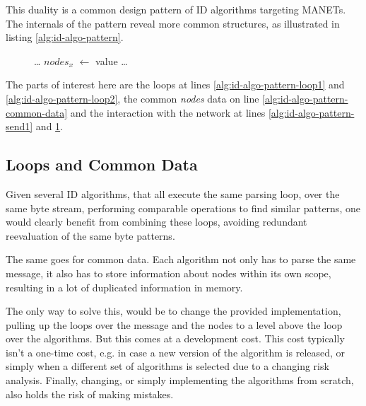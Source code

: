 \documentclass[conference]{IEEEtran}
\newcommand*\Let[2]{\State #1 $\gets$ #2}
\let\ForEach\ForAll
\begin{document}
This duality is a common design pattern of ID algorithms targeting MANETs. The
internals of the pattern reveal more common structures, as illustrated in
listing \ref{alg:id-algo-pattern}.

\begin{figure}[H]
\begin{algorithmic}[1]
    \ForEach{$byte \in msg$} \label{alg:id-algo-pattern-loop1}
     \State \dots {}
    \EndFor
    \Let{$nodes_x$}{value}  
    \State {}  \label{alg:id-algo-pattern-send1}
  \EndFunction
  \State
    \ForEach{$node \in nodes$} \label{alg:id-algo-pattern-loop2} \label{alg:id-algo-pattern-common-data}
       
        \State \dots {}
        \State {}  \label{alg:id-algo-pattern-send2}
      \EndIf
    \EndFor
  \EndFunction
  \State
\end{algorithmic}
\end{figure}

The parts of interest here are the loops at lines
\ref{alg:id-algo-pattern-loop1} and \ref{alg:id-algo-pattern-loop2}, the common
\emph{nodes} data on line \ref{alg:id-algo-pattern-common-data} and the
interaction with the network at lines \ref{alg:id-algo-pattern-send1} and
\ref{alg:id-algo-pattern-send2}.

\subsection{Loops and Common Data}

Given several ID algorithms, that all execute the same parsing loop, over the
same byte stream, performing comparable operations to find similar patterns,
one would clearly benefit from combining these loops, avoiding redundant
reevaluation of the same byte patterns.

The same goes for common data. Each algorithm not only has to parse the same
message, it also has to store information about nodes within its own scope,
resulting in a lot of duplicated information in memory.

The only way to solve this, would be to change the provided implementation,
pulling up the loops over the message and the nodes to a level above the loop
over the algorithms. But this comes at a development cost. This cost typically
isn't a one-time cost, e.g. in case a new version of the algorithm is released,
or simply when a different set of algorithms is selected due to a changing risk
analysis. Finally, changing, or simply implementing the algorithms from
scratch, also holds the risk of making mistakes.
\end{document}
